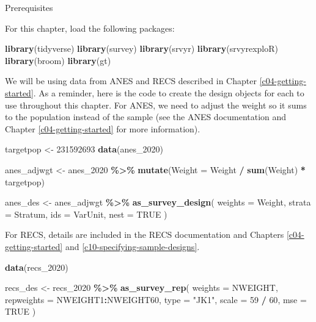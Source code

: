 \documentclass[
]{krantz}
\makeatletter
\newenvironment{Shaded}{\begin{snugshade}}{\end{snugshade}}
\newcommand{\AttributeTok}[1]{\textcolor[rgb]{0.27,0.27,0.27}{#1}}
\newcommand{\ConstantTok}[1]{\textcolor[rgb]{0.37,0.37,0.37}{#1}}
\newcommand{\DecValTok}[1]{\textcolor[rgb]{0.06,0.06,0.06}{#1}}
\newcommand{\FunctionTok}[1]{\textcolor[rgb]{0.27,0.27,0.27}{\textbf{#1}}}
\newcommand{\NormalTok}[1]{#1}
\newcommand{\OtherTok}[1]{\textcolor[rgb]{0.37,0.37,0.37}{#1}}
\newcommand{\SpecialCharTok}[1]{\textcolor[rgb]{0.43,0.43,0.43}{\textbf{#1}}}
\newcommand{\StringTok}[1]{\textcolor[rgb]{0.5,0.5,0.5}{#1}}
\newenvironment{kframe}{%
\medskip{}
\setlength{\fboxsep}{.8em}
 \def\at@end@of@kframe{}%
 \ifinner\ifhmode%
  \def\at@end@of@kframe{\end{minipage}}%
  \begin{minipage}{\columnwidth}%
 \fi\fi%
 \def\FrameCommand##1{\hskip\@totalleftmargin \hskip-\fboxsep
 \colorbox{shadecolor}{##1}\hskip-\fboxsep
     \hskip-\linewidth \hskip-\@totalleftmargin \hskip\columnwidth}%
 \MakeFramed {\advance\hsize-\width
   \@totalleftmargin\z@ \linewidth\hsize
   \@setminipage}}%
 {\par\unskip\endMakeFramed%
 \at@end@of@kframe}
\renewenvironment{Shaded}{\begin{kframe}}{\end{kframe}}
\makeatother
\begin{document}
\begin{prereqbox}{Prerequisites}

For this chapter, load the following packages:

\begin{Shaded}
\begin{Highlighting}[]
\FunctionTok{library}\NormalTok{(tidyverse)}
\FunctionTok{library}\NormalTok{(survey)}
\FunctionTok{library}\NormalTok{(srvyr)}
\FunctionTok{library}\NormalTok{(srvyrexploR)}
\FunctionTok{library}\NormalTok{(broom)}
\FunctionTok{library}\NormalTok{(gt)}
\end{Highlighting}
\end{Shaded}

We will be using data from ANES and RECS described in Chapter \ref{c04-getting-started}. As a reminder, here is the code to create the design objects for each to use throughout this chapter. For ANES, we need to adjust the weight so it sums to the population instead of the sample (see the ANES documentation and Chapter \ref{c04-getting-started} for more information).

\begin{Shaded}
\begin{Highlighting}[]
\NormalTok{targetpop }\OtherTok{\textless{}{-}} \DecValTok{231592693}
\FunctionTok{data}\NormalTok{(anes\_2020)}

\NormalTok{anes\_adjwgt }\OtherTok{\textless{}{-}}\NormalTok{ anes\_2020 }\SpecialCharTok{\%\textgreater{}\%}
  \FunctionTok{mutate}\NormalTok{(}\AttributeTok{Weight =}\NormalTok{ Weight }\SpecialCharTok{/} \FunctionTok{sum}\NormalTok{(Weight) }\SpecialCharTok{*}\NormalTok{ targetpop)}

\NormalTok{anes\_des }\OtherTok{\textless{}{-}}\NormalTok{ anes\_adjwgt }\SpecialCharTok{\%\textgreater{}\%}
  \FunctionTok{as\_survey\_design}\NormalTok{(}
    \AttributeTok{weights =}\NormalTok{ Weight,}
    \AttributeTok{strata =}\NormalTok{ Stratum,}
    \AttributeTok{ids =}\NormalTok{ VarUnit,}
    \AttributeTok{nest =} \ConstantTok{TRUE}
\NormalTok{  )}
\end{Highlighting}
\end{Shaded}

For RECS, details are included in the RECS documentation and Chapters \ref{c04-getting-started} and \ref{c10-specifying-sample-designs}.

\begin{Shaded}
\begin{Highlighting}[]
\FunctionTok{data}\NormalTok{(recs\_2020)}

\NormalTok{recs\_des }\OtherTok{\textless{}{-}}\NormalTok{ recs\_2020 }\SpecialCharTok{\%\textgreater{}\%}
  \FunctionTok{as\_survey\_rep}\NormalTok{(}
    \AttributeTok{weights =}\NormalTok{ NWEIGHT,}
    \AttributeTok{repweights =}\NormalTok{ NWEIGHT1}\SpecialCharTok{:}\NormalTok{NWEIGHT60,}
    \AttributeTok{type =} \StringTok{"JK1"}\NormalTok{,}
    \AttributeTok{scale =} \DecValTok{59} \SpecialCharTok{/} \DecValTok{60}\NormalTok{,}
    \AttributeTok{mse =} \ConstantTok{TRUE}
\NormalTok{  )}
\end{Highlighting}
\end{Shaded}

\end{prereqbox}
\end{document}

